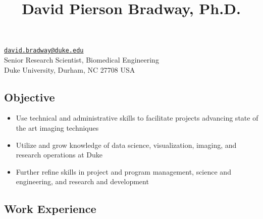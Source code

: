 \documentclass[
]{article}
\title{David Pierson Bradway, Ph.D.}
\author{}
\date{}
\providecommand{\tightlist}{%
  \setlength{\itemsep}{0pt}\setlength{\parskip}{0pt}}
\begin{document}
\maketitle

\href{mailto:david.bradway@duke.edu}{\nolinkurl{david.bradway@duke.edu}}\\
Senior Research Scientist, Biomedical Engineering\\
Duke University, Durham, NC 27708 USA

\subsection{Objective}\label{objective}

\begin{itemize}
\tightlist
\item
  Use technical and administrative skills to facilitate projects
  advancing state of the art imaging techniques
\item
  Utilize and grow knowledge of data science, visualization, imaging,
  and research operations at Duke
\item
  Further refine skills in project and program management, science and
  engineering, and research and development
\end{itemize}

\subsection{Work Experience}\label{work-experience}
\end{document}
